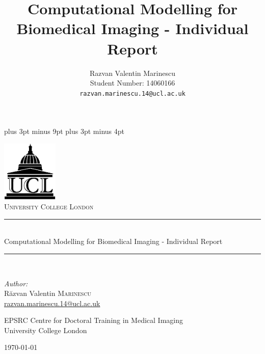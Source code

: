 \documentclass[11pt,a4paper,oneside]{report}
\title{Computational Modelling for Biomedical Imaging - Individual Report}
\author{
Razvan Valentin Marinescu\\
Student Number: 14060166\\
\texttt{razvan.marinescu.14@ucl.ac.uk}
}
\begin{document}
\belowdisplayskip=12pt plus 3pt minus 9pt
\belowdisplayshortskip=7pt plus 3pt minus 4pt

\begin{titlepage}
\begin{center}

\includegraphics[width=0.2\textwidth]{ucl-logo2}~\\[1cm]

\textsc{\LARGE University College London}\\[1.5cm]

\newcommand{\HRule}{\rule{\linewidth}{0.5mm}}

\HRule \\[0.4cm]
{ \Large Computational Modelling for Biomedical Imaging - Individual Report \\[0.4cm] }

\HRule \\[1.5cm]

\begin{minipage}{0.4\textwidth}
\centering
\emph{Author:}\\
R\u{a}zvan Valentin \textsc{Marinescu}\\
\href{razvan.marinescu.14@ucl.ac.uk}{razvan.marinescu.14@ucl.ac.uk}\\
\end{minipage}


\vfill

\vfill
\vfill

EPSRC Centre for Doctoral Training in Medical Imaging\\ University College London

\vfill

{\large \today}

\end{center}
\end{titlepage}


\end{document}
